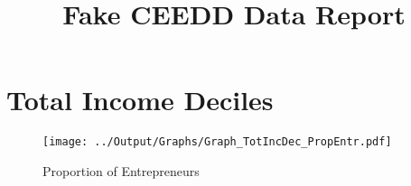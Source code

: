 \documentclass[12pt,notitlepage]{article}
\title{Fake CEEDD Data Report}
\author{}
\date{}
\begin{document}
\maketitle
\tableofcontents
\pagebreak



\FloatBarrier
\section{Total Income Deciles} %
\label{sec:total_income_deciles}
\FloatBarrier



\begin{figure}[!htpb]
\centering
\caption{Proportion of Entrepreneurs}
 \texttt{[image: ../Output/Graphs/Graph\_TotIncDec\_PropEntr.pdf]}

\end{figure}



\end{document}
